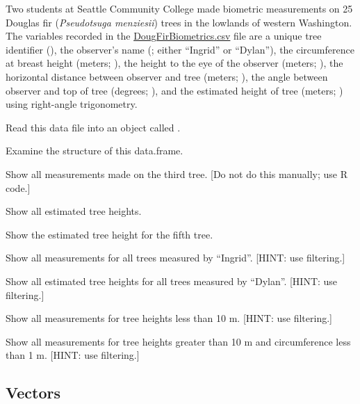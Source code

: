 \documentclass[10pt,openany]{book}\usepackage[]{graphicx}\usepackage[]{color}
\begin{document}

\begin{exsection}
  \item \label{revex:BasicsDataFrame1} \rhw{} Two students at Seattle Community College made biometric measurements on 25 Douglas fir (\emph{Pseudotsuga menziesii}) trees in the lowlands of western Washington.  The variables recorded in the \href{https://raw.githubusercontent.com/droglenc/NCData/master/DougFirBiometrics.csv}{DougFirBiometrics.csv} file are a unique tree identifier (), the observer's name (; either ``Ingrid'' or ``Dylan''), the circumference at breast height (meters; ), the height to the eye of the observer (meters; ), the horizontal distance between observer and tree (meters; ), the angle between observer and top of tree (degrees; ), and the estimated height of tree (meters; ) using right-angle trigonometry. 
  \begin{Enumerate}
    \item Read this data file into an object called .
    \item Examine the structure of this data.frame.
    \item Show all measurements made on the third tree. [Do not do this manually; use R code.]
    \item Show all estimated tree heights.
    \item Show the estimated tree height for the fifth tree.
    \item Show all measurements for all trees measured by ``Ingrid''.  [HINT: use filtering.]
    \item Show all estimated tree heights for all trees measured by ``Dylan''.  [HINT: use filtering.]
    \item Show all measurements for tree heights less than 10 m.  [HINT: use filtering.]
    \item Show all measurements for tree heights greater than 10 m and circumference less than 1 m.  [HINT: use filtering.]
  \end{Enumerate}
\end{exsection}

\vspace{-12pt}
\subsection{Vectors}  \label{sect:RVectors}
\vspace{-12pt}
\end{document}

